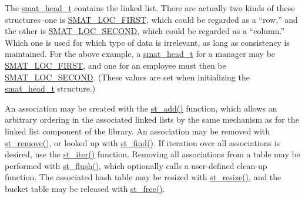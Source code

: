 The \hyperlink{group__dbprim__smat_a1}{smat\_\-head\_\-t} contains the linked list. There are actually two kinds of these structures--one is \hyperlink{group__dbprim__smat_a47a135}{SMAT\_\-LOC\_\-FIRST}, which could be regarded as a ``row,'' and the other is \hyperlink{group__dbprim__smat_a47a136}{SMAT\_\-LOC\_\-SECOND}, which could be regarded as a ``column.'' Which one is used for which type of data is irrelevant, as long as consistency is maintained. For the above example, a \hyperlink{group__dbprim__smat_a1}{smat\_\-head\_\-t} for a manager may be \hyperlink{group__dbprim__smat_a47a135}{SMAT\_\-LOC\_\-FIRST}, and one for an employee must then be \hyperlink{group__dbprim__smat_a47a136}{SMAT\_\-LOC\_\-SECOND}. (These values are set when initializing the \hyperlink{group__dbprim__smat_a1}{smat\_\-head\_\-t} structure.)

An association may be created with the \hyperlink{group__dbprim__smat_a10}{st\_\-add()} function, which allows an arbitrary ordering in the associated linked lists by the same mechanism as for the linked list component of the library. An association may be removed with \hyperlink{group__dbprim__smat_a11}{st\_\-remove()}, or looked up with \hyperlink{group__dbprim__smat_a12}{st\_\-find()}. If iteration over all associations is desired, use the \hyperlink{group__dbprim__smat_a13}{st\_\-iter()} function. Removing all associations from a table may be performed with \hyperlink{group__dbprim__smat_a14}{st\_\-flush()}, which optionally calls a user-defined clean-up function. The associated hash table may be resized with \hyperlink{group__dbprim__smat_a15}{st\_\-resize()}, and the bucket table may be released with \hyperlink{group__dbprim__smat_a16}{st\_\-free()}.

